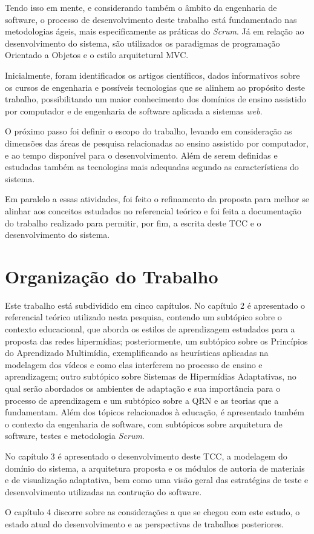 Tendo isso em mente, e considerando também o âmbito da engenharia de software, o processo de desenvolvimento deste trabalho está fundamentado nas metodologias ágeis, mais especificamente as práticas do \textit{Scrum}. Já em relação ao desenvolvimento do sistema, são utilizados os paradigmas de programação Orientado a Objetos e o estilo arquitetural MVC.

Inicialmente, foram identificados os artigos científicos, dados informativos sobre os cursos de engenharia e possíveis tecnologias que se alinhem ao propósito deste trabalho, possibilitando um maior conhecimento dos domínios de ensino assistido por computador e de engenharia de software aplicada a sistemas \textit{web}.

O próximo passo foi definir o escopo do trabalho, levando em consideração as dimensões das áreas de pesquisa relacionadas ao ensino assistido por computador, e ao tempo disponível para o desenvolvimento. Além de serem definidas e estudadas também as tecnologias mais adequadas segundo as características do sistema.

Em paralelo a essas atividades, foi feito o refinamento da proposta para melhor se alinhar aos conceitos estudados no referencial teórico e foi feita a documentação do trabalho realizado para permitir, por fim, a escrita deste TCC e o desenvolvimento do sistema.

\section[Organização do Trabalho]{Organização do Trabalho}

Este trabalho está subdividido em cinco capítulos. No capítulo 2 é apresentado o referencial teórico utilizado nesta pesquisa, contendo um subtópico sobre o contexto educacional, que aborda os estilos de aprendizagem estudados para a proposta das redes hipermídias; posteriormente, um subtópico sobre os Princípios do Aprendizado Multimídia, exemplificando as heurísticas aplicadas na modelagem dos vídeos e como elas interferem no processo de ensino e aprendizagem; outro subtópico sobre Sistemas de Hipermídias Adaptativas, no qual serão abordados os ambientes de adaptação e sua importância para o processo de aprendizagem e um subtópico sobre a QRN e as teorias que a fundamentam. Além dos tópicos relacionados à educação, é apresentado também o contexto da engenharia de software, com subtópicos sobre arquitetura de software, testes e  metodologia \textit{Scrum}.

No capítulo 3 é apresentado o desenvolvimento deste TCC, a modelagem do domínio do sistema, a arquitetura proposta e os módulos de autoria de materiais e de visualização adaptativa, bem como uma visão geral das estratégias de teste e desenvolvimento utilizadas na contrução do software.

O capítulo 4 discorre sobre as considerações a que se chegou com este estudo, o estado atual do desenvolvimento e as perspectivas de trabalhos posteriores.
